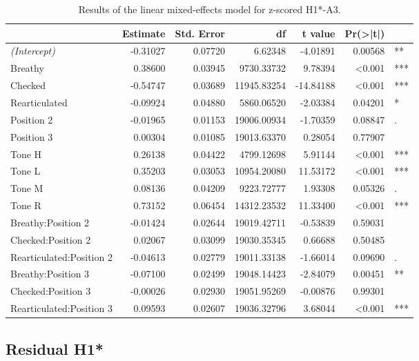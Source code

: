 \documentclass[12pt, letterpaper]{article}
\providecommand{\lsptoprule}{\midrule\toprule}
\providecommand{\lspbottomrule}{\bottomrule\midrule}
\begin{document}
\begin{table}[!h]
  \centering
  \caption{Results of the linear mixed-effects model for z-scored H1*-A3.}
  \label{tab:H1A3Results}
  \begin{tabular}{lrrrrrl}
    \lsptoprule
     & Estimate & Std. Error & df & t value & Pr(>|t|) & \\ \hline
     \textit{(Intercept)} & -0.31027 & 0.07720 & 6.62348 & -4.01891 & 0.00568 & **\\
    Breathy & 0.38600 & 0.03945 & 9730.33732 & 9.78394 & \textless 0.001 & ***\\
    Checked & -0.54747 & 0.03689 & 11945.83254 & -14.84188 & \textless 0.001 & ***\\
    Rearticulated & -0.09924 & 0.04880 & 5860.06520 & -2.03384 & 0.04201 & *\\
    Position 2 & -0.01965 & 0.01153 & 19006.00934 & -1.70359 & 0.08847 & .\\
    Position 3 & 0.00304 & 0.01085 & 19013.63370 & 0.28054 & 0.77907 & \\
    Tone H & 0.26138 & 0.04422 & 4799.12698 & 5.91144 & \textless 0.001 & ***\\
    Tone L & 0.35203 & 0.03053 & 10954.20080 & 11.53172 & \textless 0.001 & ***\\
    Tone M & 0.08136 & 0.04209 & 9223.72777 & 1.93308 & 0.05326 & .\\
    Tone R & 0.73152 & 0.06454 & 14312.23532 & 11.33400 & \textless 0.001 & ***\\
    Breathy:Position 2 & -0.01424 & 0.02644 & 19019.42711 & -0.53839 & 0.59031 & \\
    Checked:Position 2 & 0.02067 & 0.03099 & 19030.35345 & 0.66688 & 0.50485 & \\
    Rearticulated:Position 2 & -0.04613 & 0.02779 & 19011.33138 & -1.66014 & 0.09690 & .\\
    Breathy:Position 3 & -0.07100 & 0.02499 & 19048.14423 & -2.84079 & 0.00451 & **\\
    Checked:Position 3 & -0.00026 & 0.02930 & 19051.95269 & -0.00876 & 0.99301 & \\
    Rearticulated:Position 3 & 0.09593 & 0.02607 & 19036.32796 & 3.68044 & \textless 0.001 & ***\\
    \lspbottomrule
  \end{tabular}
\end{table}

\subsection{Residual H1*} \label{sec:ResidH1}
\end{document}
